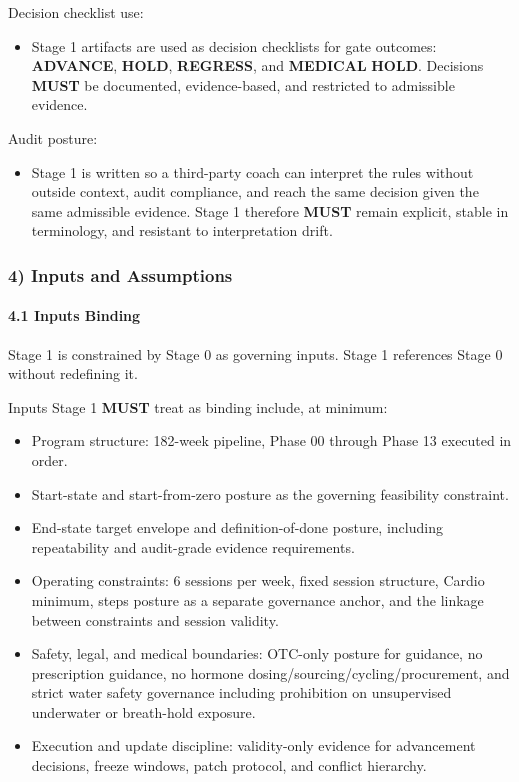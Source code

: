 \documentclass[10pt]{article}
\begin{document}
Decision checklist use:

\begin{itemize}
\item Stage 1 artifacts are used as decision checklists for gate outcomes: \textbf{ADVANCE}, \textbf{HOLD}, \textbf{REGRESS}, and \textbf{MEDICAL} \textbf{HOLD}. Decisions \textbf{MUST} be documented, evidence-based, and restricted to admissible evidence.
\end{itemize}

Audit posture:

\begin{itemize}
\item Stage 1 is written so a third-party coach can interpret the rules without outside context, audit compliance, and reach the same decision given the same admissible evidence. Stage 1 therefore \textbf{MUST} remain explicit, stable in terminology, and resistant to interpretation drift.
\end{itemize}

\subsubsection*{4) Inputs and Assumptions}

\paragraph*{4.1 Inputs Binding}

Stage 1 is constrained by Stage 0 as governing inputs. Stage 1 references Stage 0 without redefining it.

Inputs Stage 1 \textbf{MUST} treat as binding include, at minimum:

\begin{itemize}
\item Program structure: 182-week pipeline, Phase 00 through Phase 13 executed in order.
\item Start-state and start-from-zero posture as the governing feasibility constraint.
\item End-state target envelope and definition-of-done posture, including repeatability and audit-grade evidence requirements.
\item Operating constraints: 6 sessions per week, fixed session structure, Cardio minimum, steps posture as a separate governance anchor, and the linkage between constraints and session validity.
\item Safety, legal, and medical boundaries: OTC-only posture for guidance, no prescription guidance, no hormone dosing/sourcing/cycling/procurement, and strict water safety governance including prohibition on unsupervised underwater or breath-hold exposure.
\item Execution and update discipline: validity-only evidence for advancement decisions, freeze windows, patch protocol, and conflict hierarchy.
\end{itemize}
\end{document}
